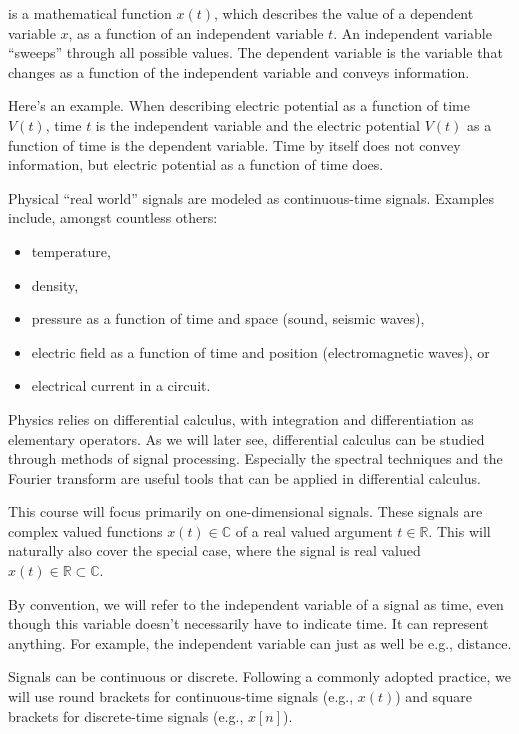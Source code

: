  is a mathematical function $x(t)$, which describes the value of a  dependent variable $x$, as a function of an independent variable $t$. An independent variable ``sweeps'' through all possible values. The dependent variable is the variable that changes as a function of the independent variable and conveys information.

Here's an example. When describing electric potential as a function of time $V(t)$, time $t$ is the independent variable and the electric potential $V(t)$ as a function of time is the dependent variable. Time by itself does not convey information, but electric potential as a function of time does.

Physical ``real world'' signals are modeled as continuous-time signals. Examples include, amongst countless others:
\begin{itemize}
 \setlength\itemsep{0.25em}        
\item temperature,
\item density,
\item pressure as a function of time and space (sound, seismic waves),
\item electric field as a function of time and position
  (electromagnetic waves), or
\item electrical current in a circuit.
\end{itemize}
Physics relies on differential calculus, with integration and differentiation as elementary operators. As we will later see, differential calculus can be studied through methods of signal processing. Especially the spectral techniques and the Fourier transform are useful tools that can be applied in differential calculus.

This course will focus primarily on one-dimensional signals. These signals are complex valued functions $x(t) \in \mathbb{C}$ of a real valued argument $t\in \mathbb{R}$. This will naturally also cover the
special case, where the signal is real valued
$x(t) \in \mathbb{R} \subset\mathbb{C}$. 

By convention, we will refer to the independent variable of a signal as time, even though this variable doesn't necessarily have to indicate time. It can represent anything. For example, the independent variable can just as well be e.g., distance.

Signals can be continuous or discrete. Following a commonly adopted practice, we will use round brackets for continuous-time signals (e.g., $x(t)$) and square brackets for discrete-time signals (e.g., $x[n]$). 

